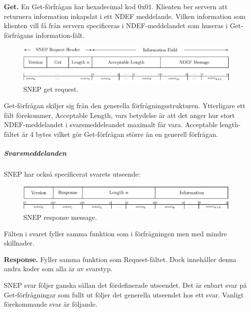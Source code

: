 \documentclass[11pt]{article}
\begin{document}
\textbf{Get.} En Get-förfrågan har hexadecimal kod 0x01. Klienten ber servern att returnera information inkapslat i ett NDEF meddelande. Vilken information som klienten vill få från servern specificeras i NDEF-meddelandet som huseras i Get-förfrågans information-fält. 

\begin{figure}[H]
\centering
\includegraphics[scale=0.8]{SNEP_get_request.jpg}
\caption{SNEP get request.}
\label{fig:SNEP_get_request}
\end{figure}

Get-förfrågan skiljer sig från den generella förfrågningsstrukturen. Ytterligare ett fält förekommer, Acceptable Length, vars betydelse är att det anger hur stort NDEF-meddelandet i svarsmeddeleandet maximalt får vara. Acceptable length-fältet är 4 bytes vilket gör Get-förfrågan större än en generell förfrågan.

\subparagraph{Svarsmeddelanden}
SNEP har också specificerat svarets utseende:

\begin{figure}[H]
\centering
\includegraphics[scale=0.8]{SNEP_response_message.jpg}
\caption{SNEP response message.}
\label{fig:SNEP_response_message}
\end{figure}

Fälten i svaret fyller samma funktion som i förfrågningen men med mindre skillnader.

\textbf{Response.} Fyller samma funktion som Request-fältet. Dock innehåller denna andra koder som alla är av svarstyp.

SNEP svar följer ganska sällan det fördefinerade utseendet. Det är enbart svar på Get-förfrågningar som fullt ut följer det generella utseendet hos ett svar. Vanligt förekommande svar är följande.
\end{document}
